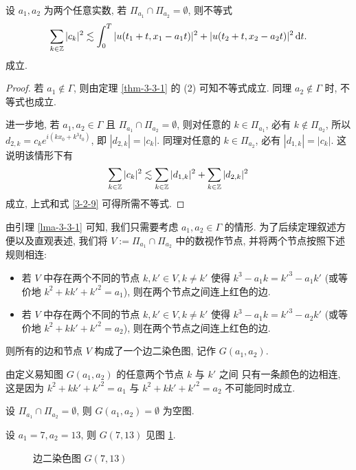 \begin{lemma}\label{lma-3-3-1}
设 $a_1,a_2$ 为两个任意实数, 若 $\Pi_{a_1}\cap \Pi_{a_2}=\emptyset$, 则不等式
\begin{equation} 
    \sum\limits_{k\in \mathbb{Z}} |c_k|^2\lesssim\int_0^T |u(t_1+t,x_1-a_1t)|^2 + |u(t_2+t,x_2-a_2t)|^2\,\mathrm{d} t.
\end{equation}
成立.
\end{lemma}
\begin{proof}
 若 $a_1\notin \Gamma$, 则由定理 \ref{thm-3-3-1} 的 (2) 可知不等式成立. 同理 $a_2\notin \Gamma$ 时, 不等式也成立. 

进一步地, 若 $a_1,a_2\in \Gamma $ 且 $\Pi_{a_1}\cap \Pi_{a_2}=\emptyset$, 则对任意的 $k\in \Pi_{a_1}$, 必有 $k\notin \Pi_{a_2}$, 所以 $d_{2,k}=c_k e^{i(kx_0+k^3t_0)}$, 即 $|d_{2,k}|=|c_k|$. 同理对任意的 $k\in \Pi_{a_2}$, 必有 $|d_{1,k}|=|c_k|$. 这说明该情形下有
\begin{equation*}
    \sum_{k\in \mathbb{Z} }|c_k|^2\lesssim \sum_{k\in \mathbb{Z} }|d_{1,k}|^2+\sum_{k\in\mathbb{Z}}|d_{2,k}|^2
\end{equation*}
成立, 上式和式 \eqref{3-2-9} 可得所需不等式.
\end{proof}

由引理 \ref{lma-3-3-1} 可知, 我们只需要考虑 $a_1,a_2\in \Gamma$ 的情形. 为了后续定理叙述方便以及直观表述, 我们将 $V:=\Pi_{a_1}\cap \Pi_{a_2}$ 中的数视作节点, 并将两个节点按照下述规则相连:
\begin{itemize}
    \item 若 $V$ 中存在两个不同的节点 $k,k'\in V, k\neq k'$ 使得 $k^3-a_1k=k'^3-a_1k'$ (或等价地 $k^2+kk'+k'^2=a_1$), 则在两个节点之间连上红色的边.
    \item 若 $V$ 中存在两个不同的节点 $k,k'\in V, k\neq k'$ 使得 $k^3-a_1k=k'^3-a_2k'$ (或等价地 $k^2+kk'+k'^2=a_2$), 则在两个节点之间连上红色的边.
\end{itemize}
则所有的边和节点 $V$ 构成了一个边二染色图, 记作 $G(a_1,a_2)$.

由定义易知图 $G(a_1,a_2)$ 的任意两个节点 $k$ 与 $k'$ 之间 只有一条颜色的边相连, 这是因为
$k^2+kk'+k'^2=a_1$ 与 $k^2+kk'+k'^2=a_2$ 不可能同时成立.
\begin{example}
设 $\Pi_{a_1}\cap \Pi_{a_2}=\emptyset$, 则 $G(a_1,a_2)=\emptyset$ 为空图. 
\end{example}
\begin{example}\label{exa-important}
设 $a_1=7,a_2=13$, 则 $G(7,13)$ 见图 \ref{fig:G-7-13}.
\begin{figure}[htbp]
    \centering
    \caption{边二染色图 $G(7,13)$}
    \label{fig:G-7-13}
\end{figure}
\end{example}


